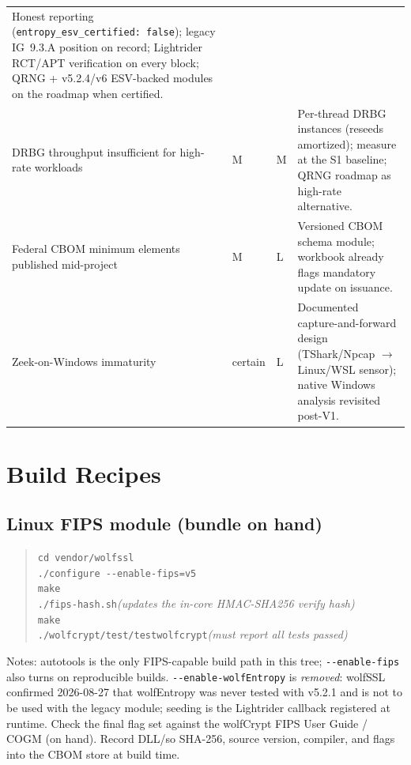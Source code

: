 \documentclass[10pt]{article}
\newcommand{\code}[1]{\texttt{\small #1}}
\begin{document}
\begin{small}
\begin{tabularx}{\textwidth}{@{}Lll L@{}}
  Honest reporting (\code{entropy\_esv\_certified:\ false}); legacy IG~9.3.A position on
  record; Lightrider RCT/APT verification on every block; QRNG + v5.2.4/v6 ESV-backed
  modules on the roadmap when certified. \\
DRBG throughput insufficient for high-rate workloads & M & M & Per-thread DRBG
  instances (reseeds amortized); measure at the S1 baseline; QRNG roadmap as high-rate
  alternative. \\
Federal CBOM minimum elements published mid-project & M & L & Versioned CBOM schema
  module; workbook already flags mandatory update on issuance. \\
Zeek-on-Windows immaturity & certain & L & Documented capture-and-forward design
  (TShark/Npcap $\rightarrow$ Linux/WSL sensor); native Windows analysis revisited post-V1. \\
\bottomrule
\end{tabularx}
\end{small}

\appendix

\section{Build Recipes}\label{app:build}

\subsection*{Linux FIPS module (bundle on hand)}
\begin{quote}
\code{cd vendor/wolfssl}\\
\code{./configure -{}-enable-fips=v5}\\
\code{make}\\
\code{./fips-hash.sh}\quad\emph{\small(updates the in-core HMAC-SHA256 verify hash)}\\
\code{make}\\
\code{./wolfcrypt/test/testwolfcrypt}\quad\emph{\small(must report all tests passed)}
\end{quote}
Notes: autotools is the only FIPS-capable build path in this tree; \code{-{}-enable-fips}
also turns on reproducible builds. \code{-{}-enable-wolfEntropy} is \emph{removed}:
wolfSSL confirmed 2026-08-27 that wolfEntropy was never tested with v5.2.1 and is not to
be used with the legacy module; seeding is the Lightrider callback registered at runtime.
Check the final flag set against the wolfCrypt FIPS User Guide / COGM (on hand). Record
DLL/so SHA-256, source version, compiler, and flags into the CBOM store at build time.
\end{document}
